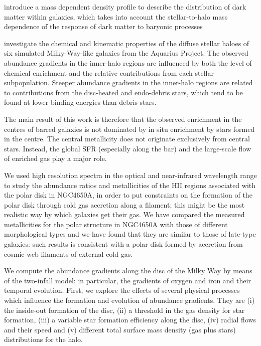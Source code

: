 \documentclass[11pt, a4paper, onecolumn]{article}
\begin{document}
\begin{multicols}{2}
    \citet{dicintio14b} introduce a mass dependent density profile to describe
    the distribution of dark matter within galaxies, which takes into account
    the stellar-to-halo mass dependence of the response of dark matter to
    baryonic processes

    \citet{tissera13} investigate the chemical and kinematic properties of the
    diffuse stellar haloes of six simulated Milky-Way-like galaxies from the
    Aquarius Project. The observed abundance gradients in the inner-halo
    regions are influenced by both the level of chemical enrichment and the
    relative contributions from each stellar subpopulation. Steeper abundance
    gradients in the inner-halo regions are related to contributions from the
    disc-heated and endo-debris stars, which tend to be found at lower binding
    energies than debris stars. 

    \citet{martel13} The main result of this work is therefore that the
    observed enrichment in the centres of barred galaxies is not dominated by
    in situ enrichment by stars formed in the centre. The central metallicity
    does not originate exclusively from central stars. Instead, the global SFR
    (especially along the bar) and the large-scale flow of enriched gas play a
    major role.

    \citet{spavone10} We used high resolution spectra in the optical and
    near-infrared wavelength range to study the abundance ratios and
    metallicities of the HII regions associated with the polar disk in
    NGC4650A, in order to put constraints on the formation of the polar disk
    through cold gas accretion along a filament; this might be the most
    realistic way by which galaxies get their gas. We have compared the
    measured metallicities for the polar structure in NGC4650A with those of
    different morphological types and we have found that they are similar to
    those of late-type galaxies: such results is consistent with a polar disk
    formed by accretion from cosmic web filaments of external cold gas.

    \citet{mott13} We compute the abundance gradients along the disc of the
    Milky Way by means of the two-infall model: in particular, the gradients of
    oxygen and iron and their temporal evolution. First, we explore the effects
    of several physical processes which influence the formation and evolution
    of abundance gradients. They are (i) the inside-out formation of the disc,
    (ii) a threshold in the gas density for star formation, (iii) a variable
    star formation efficiency along the disc, (iv) radial flows and their speed
    and (v) different total surface mass density (gas plus stars) distributions
    for the halo. 


\end{multicols}
\end{document}
